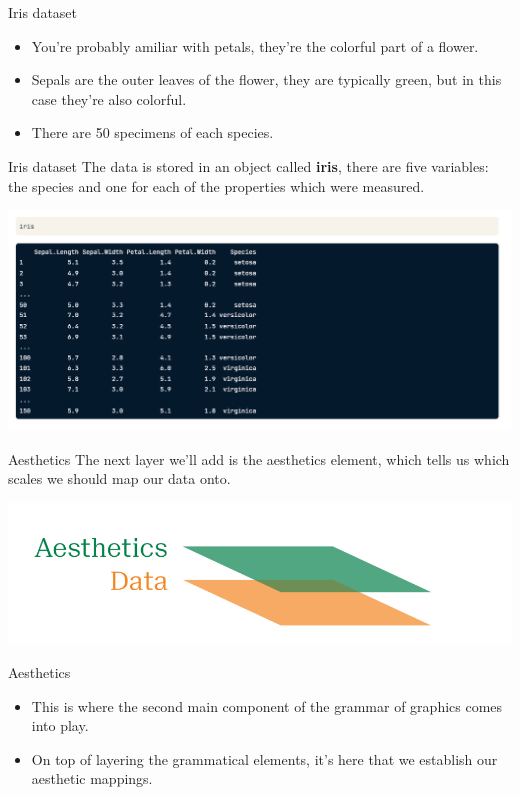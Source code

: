 \documentclass[
  ignorenonframetext,
]{beamer}
\begin{document}
\begin{frame}{Iris dataset}
\label{iris-dataset-2}
\begin{itemize}
\item
  You're probably amiliar with petals, they're the colorful part of a
  flower.
\item
  Sepals are the outer leaves of the flower, they are typically green,
  but in this case they're also colorful.
\item
  There are 50 specimens of each species.
\end{itemize}
\end{frame}

\begin{frame}{Iris dataset}
\label{iris-dataset-3}
The data is stored in an object called \textbf{iris}, there are five
variables: the species and one for each of the properties which were
measured.

\includegraphics{../images/im128.png}
\end{frame}

\begin{frame}{Aesthetics}
\label{aesthetics}
The next layer we'll add is the aesthetics element, which tells us which
scales we should map our data onto.

\includegraphics{../images/im129.png}
\end{frame}

\begin{frame}{Aesthetics}
\label{aesthetics-1}
\begin{itemize}
\item
  This is where the second main component of the grammar of graphics
  comes into play.
\item
  On top of layering the grammatical elements, it's here that we
  establish our aesthetic mappings.
\end{itemize}
\end{frame}
\end{document}
